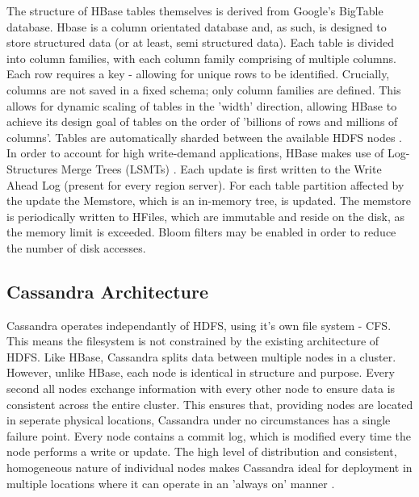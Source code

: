 \documentclass[10pt]{article}
\begin{document}
The structure of HBase tables themselves is derived from Google's BigTable database. Hbase is a column orientated database and, as such, is designed to store structured data (or at least, semi structured data). Each table is divided into column families, with each column family comprising of multiple columns. Each row requires a key - allowing for unique rows to be identified. Crucially, columns are not saved in a fixed schema; only column families are defined. This allows for dynamic scaling of tables in the 'width' direction, allowing HBase to achieve its design goal of tables on the order of 'billions of rows and millions of columns'. Tables are automatically sharded between the available HDFS nodes \cite{hbaseref}.\\

In order to account for high write-demand applications, HBase makes use of Log-Structures Merge Trees (LSMTs)  \cite{hbaseref}. Each update is first written to the Write Ahead Log (present for every region server). For each table partition affected by the update the Memstore, which is an in-memory tree, is updated. The memstore is periodically written to HFiles,  which are immutable and reside on the disk, as the memory limit is exceeded. Bloom filters may be enabled in order to reduce the number of disk accesses.\\

\subsection{Cassandra Architecture}
Cassandra operates independantly of HDFS, using it's own file system - CFS. This means the filesystem is not constrained by the existing architecture of HDFS. Like HBase, Cassandra splits data between multiple nodes in a cluster. However, unlike HBase, each node is identical in structure and purpose. Every second all nodes exchange information with every other node to ensure data is consistent across the entire cluster. This ensures that, providing nodes are located in seperate physical locations, Cassandra under no circumstances has a single failure point. Every node contains a commit log, which is modified every time the node performs a write or update. The high level of distribution and consistent, homogeneous nature of individual nodes makes Cassandra ideal for deployment in multiple locations where it can operate in an 'always on' manner \cite{cassandraarch}.\\
\end{document}
